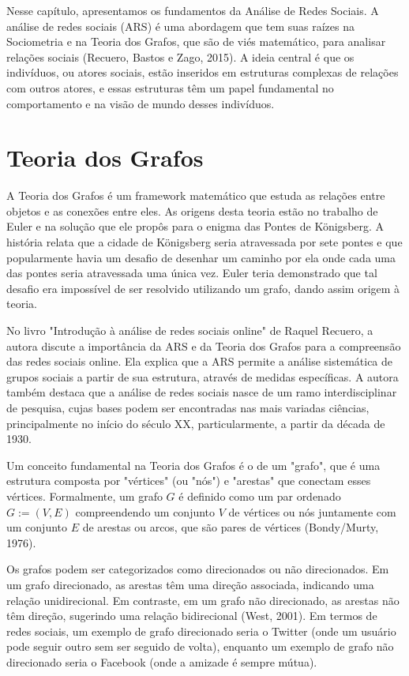 Nesse capítulo, apresentamos os fundamentos da Análise de Redes Sociais. A análise de redes sociais (ARS) é uma abordagem que tem suas raízes na Sociometria e na Teoria dos Grafos, que são de viés matemático, para analisar relações sociais (Recuero, Bastos e Zago, 2015). A ideia central é que os indivíduos, ou atores sociais, estão inseridos em estruturas complexas de relações com outros atores, e essas estruturas têm um papel fundamental no comportamento e na visão de mundo desses indivíduos.

\section{Teoria dos Grafos}
A Teoria dos Grafos é um framework matemático que estuda as relações entre objetos e as conexões entre eles. As origens desta teoria estão no trabalho de Euler e na solução que ele propôs para o enigma das Pontes de Königsberg. A história relata que a cidade de Königsberg seria atravessada por sete pontes e que popularmente havia um desafio de desenhar um caminho por ela onde cada uma das pontes seria atravessada uma única vez. Euler teria demonstrado que tal desafio era impossível de ser resolvido utilizando um grafo, dando assim origem à teoria.

No livro "Introdução à análise de redes sociais online" de Raquel Recuero, a autora discute a importância da ARS e da Teoria dos Grafos para a compreensão das redes sociais online. Ela explica que a ARS permite a análise sistemática de grupos sociais a partir de sua estrutura, através de medidas específicas. A autora também destaca que a análise de redes sociais nasce de um ramo interdisciplinar de pesquisa, cujas bases podem ser encontradas nas mais variadas ciências, principalmente no início do século XX, particularmente, a partir da década de 1930.

Um conceito fundamental na Teoria dos Grafos é o de um "grafo", que é uma estrutura composta por "vértices" (ou "nós") e "arestas" que conectam esses vértices. Formalmente, um grafo $G$ é definido como um par ordenado $G := (V, E)$ compreendendo um conjunto $V$ de vértices ou nós juntamente com um conjunto $E$ de arestas ou arcos, que são pares de vértices (Bondy/Murty, 1976).

Os grafos podem ser categorizados como direcionados ou não direcionados. Em um grafo direcionado, as arestas têm uma direção associada, indicando uma relação unidirecional. Em contraste, em um grafo não direcionado, as arestas não têm direção, sugerindo uma relação bidirecional (West, 2001). Em termos de redes sociais, um exemplo de grafo direcionado seria o Twitter (onde um usuário pode seguir outro sem ser seguido de volta), enquanto um exemplo de grafo não direcionado seria o Facebook (onde a amizade é sempre mútua).

